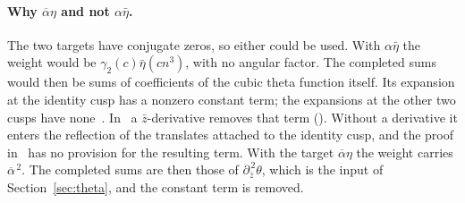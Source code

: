 \documentclass[11pt]{article}
\numberwithin{equation}{section}
\begin{document}
\paragraph{Why $\overline\alpha\eta$ and not $\alpha\bar\eta$.} The two targets have conjugate
zeros, so either could be used. With $\alpha\bar\eta$ the weight would be
$\gamma_2(c)\bar\eta(cn^3)$, with no angular factor. The completed sums would then be
sums of coefficients of the cubic theta function itself. Its expansion at the identity cusp has a
nonzero constant term; the expansions at the other two cusps have none~\cite[Theorem~23]{QF}. In~\cite{OAI78} a
$\bar z$-derivative removes that term (\cite[proof of Proposition~5.1, \emph{Mellin normalization and continuation}]{OAI78}). Without a derivative it enters the reflection of the
translates attached to the identity cusp, and the proof in~\cite{OAI78} has no provision for the resulting term.
With the target $\overline\alpha\eta$ the weight carries $\overline\alpha^{\,2}$. The completed sums are then those of
$\partial_{\bar z}^{\,2}\theta$, which is the input of Section~\ref{sec:theta}, and the constant term is
removed.
\end{document}
